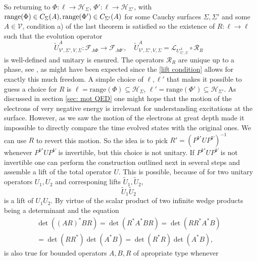 \documentclass[b5paper,draft,openbib,12pt]{memoir}
\begin{document}
So returning to \(\Phi:\ell\rightarrow \mathcal{H}_\Sigma\), 
\(\Phi':\ell\rightarrow \mathcal{H}_{\Sigma'}\), 
with
\(\mathrm{range}(\Phi)\in C_{\Sigma}(A),\\
\mathrm{range}(\Phi')\in C_{\Sigma'}(A)\) for some 
Cauchy surfaces \(\Sigma, \Sigma'\) and some \(A\in\mathcal{V}\),
condition a) of the last theorem is satisfied so 
the existence of \(R:\ell \rightarrow \ell\) 
such that the evolution operator 
\begin{equation}
  \tilde{U}^A_{V',\Sigma',V,\Sigma}:\mathcal{F}_{\mathsf{\Lambda}\Phi}\rightarrow \mathcal{F}_{\mathsf{\Lambda}\Phi'},
  \quad \tilde{U}^A_{V',\Sigma',V,\Sigma}= \mathcal{L}_{U^A_{\Sigma',\Sigma}} \circ \mathcal{R}_R
\end{equation}
is well-defined and unitary is ensured. 
The operators 
\(\mathcal{R}_R\) are unique up to a phase, see 
\cite[Cor. 2.28]{ivp0}, as might have been expected since 
the \eqref{lift condition} allows for 
exactly this much freedom. A simple choice of 
\(\ell, \ell'\) that makes it possible to guess a 
choice for \(R\) is \(\ell=\mathrm{range}(\Phi)\subseteq \mathcal{H}_\Sigma\),
\(\ell'=\mathrm{range}(\Phi')\subseteq \mathcal{H}_{\Sigma'}\).
As discussed in section \ref{sec: mot QED} one might hope 
that the motion of the electrons of very negative energy
is irrelevant for understanding excitations at the surface. 
However, as we saw the motion of the electrons at great depth
made it impossible to directly compare the time evolved 
states with the original ones.
We can use \(R\) to revert this motion.  
So the idea is to pick \(R'= (P^{V'}U P^V)^{-1}\) 
whenever \(P^{V'}U P^V\) is invertible, but 
this choice is not unitary. 
If \(P^{V'}U P^V\) is not invertible one can perform the construction 
outlined next
in several steps and assemble a lift of the total operator \(U\).
This is possible, because of for two unitary operators \(U_1,U_2\)
and corresponing lifts \(\tilde{U}_1,\tilde{U}_2\),
\begin{equation}
  \tilde{U}_1\tilde{U}_2
\end{equation}
is a lift of \(U_1 U_2\).
By virtue of the scalar product 
of two infinite wedge products being a determinant and 
the equation 
\begin{align}\label{right op calculation}
  \det((A R)^* B R)= \det(R^* A^* B R)
  = \det (R R^* A^* B)\\
  = \det (R R^*) \det (A^* B)
  =\det ( R^* R) \det (A^* B),
\end{align}
is also true for bounded operators \(A,B,R\) 
of apropriate type whenever 
\end{document}
